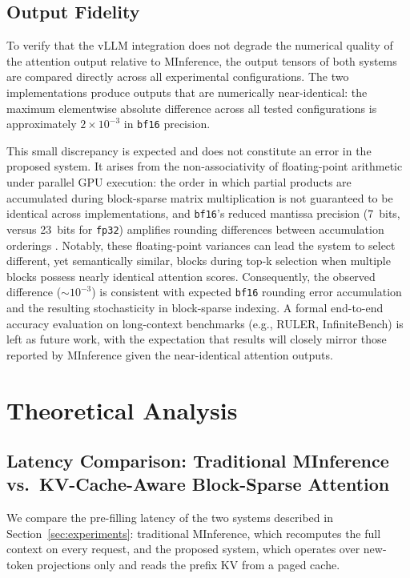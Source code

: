 \documentclass{article}
\begin{document}
\subsection{Output Fidelity}

To verify that the vLLM integration does not degrade the numerical quality
of the attention output relative to MInference, the output tensors of both
systems are compared directly across all experimental configurations. The
two implementations produce outputs that are numerically near-identical:
the maximum elementwise absolute difference across all tested
configurations is approximately $2 \times 10^{-3}$ in \texttt{bf16}
precision.

This small discrepancy is expected and does not constitute an error in the
proposed system. It arises from the non-associativity of floating-point
arithmetic under parallel GPU execution: the order in which partial
products are accumulated during block-sparse matrix multiplication is not
guaranteed to be identical across implementations, and \texttt{bf16}'s
reduced mantissa precision (7~bits, versus 23~bits for \texttt{fp32})
amplifies rounding differences between accumulation orderings
\cite{higham2002accuracy}. Notably, these floating-point variances can 
lead the system to select different, yet semantically similar, blocks 
during top-k selection when multiple blocks possess nearly identical 
attention scores. Consequently, the observed difference (${\sim}10^{-3}$) 
is consistent with expected \texttt{bf16} rounding error accumulation 
and the resulting stochasticity in block-sparse indexing. A formal 
end-to-end accuracy evaluation on long-context benchmarks (e.g., RULER, 
InfiniteBench) is left as future work, with the expectation that results 
will closely mirror those reported by MInference \cite{minference} 
given the near-identical attention outputs.

\section{Theoretical Analysis}
\label{sec:theory}

\subsection{Latency Comparison: Traditional MInference vs.\ KV-Cache-Aware Block-Sparse Attention}

We compare the pre-filling latency of the two systems described in
Section~\ref{sec:experiments}: traditional MInference, which recomputes
the full context on every request, and the proposed system, which operates
over new-token projections only and reads the prefix KV from a paged cache.
\end{document}
